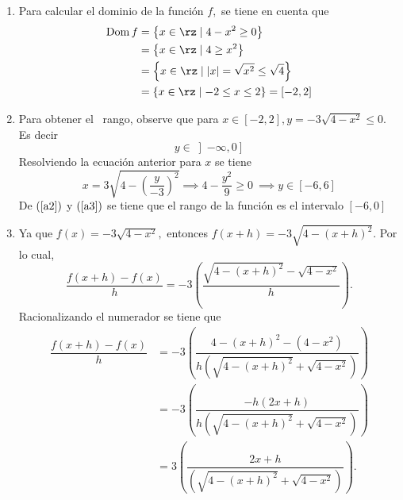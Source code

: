\begin{sol}
\begin{enumerate}
\item Para calcular el dominio de la funci\'{o}n $f,$ se tiene en cuenta que
\begin{align*}
\operatorname*{Dom}f  &  =\left\{  x\in\rz\mid4-x^{2}\geq0\right\} \\
&  =\left\{  x\in\rz\mid4\geq x^{2}\right\} \\
&  =\left\{  x\in\rz\mid\left\vert x\right\vert =\sqrt{x^{2}}\leq\sqrt
{4}\right\} \\
&  =\left\{  x\in\rz\mid-2\leq x\leq2\right\}  =\left[  -2,2\right]
\end{align*}


\item Para obtener el \ rango, observe que para $x\in\left[  -2,2\right]
,y=-3\sqrt{4-x^{2}}\leq0.$ Es decir
\begin{equation}
y\in\left]  -\infty,0\right]  \label{a2}%
\end{equation}
Resolviendo la ecuaci\'{o}n anterior para $x$ se tiene
\begin{equation}
x=3\sqrt{4-\left(  \frac{y}{-3}\right)  ^{2}}\implies4-\frac{y^{2}}{9}%
\geq0\ \implies y\in\left[  -6,6\right]  \label{a3}%
\end{equation}
De $\left(  \ref{a2}\right)  $ y $\left(  \ref{a3}\right)  $ se tiene que el
rango de la funci\'{o}n es el intervalo $\left[  -6,0\right]  $

\item Ya que $f\left(  x\right)  =-3\sqrt{4-x^{2}},$ entonces $f\left(
x+h\right)  =-3\sqrt{4-\left(  x+h\right)  ^{2}}.$ Por lo cual,%
\[
\dfrac{f\left(  x+h\right)  -f\left(  x\right)  }{h}=-3\left(  \dfrac
{\sqrt{4-\left(  x+h\right)  ^{2}}-\sqrt{4-x^{2}}}{h}\right)  .
\]
Racionalizando el numerador se tiene que
\begin{align*}
\dfrac{f\left(  x+h\right)  -f\left(  x\right)  }{h}  &  =-3\left(
\dfrac{4-\left(  x+h\right)  ^{2}-\left(  4-x^{2}\right)  }{h\left(
\sqrt{4-\left(  x+h\right)  ^{2}}+\sqrt{4-x^{2}}\right)  }\right) \\
&  =-3\left(  \dfrac{-h\left(  2x+h\right)  }{h\left(  \sqrt{4-\left(
x+h\right)  ^{2}}+\sqrt{4-x^{2}}\right)  }\right) \\
&  =3\left(  \dfrac{2x+h}{\left(  \sqrt{4-\left(  x+h\right)  ^{2}}%
+\sqrt{4-x^{2}}\right)  }\right)  .
\end{align*}

\end{enumerate}
\end{sol}

